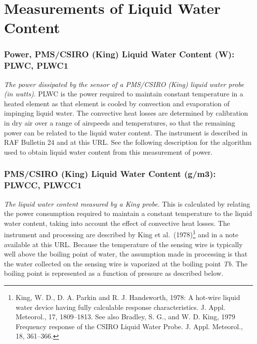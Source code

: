 \documentclass[
]{book}
\begin{document}
\hypertarget{LWC}{%
\section{Measurements of Liquid Water Content}\label{LWC}}

\hypertarget{plwc}{%
\subsubsection*{Power, PMS/CSIRO (King) Liquid Water Content (W): PLWC, PLWC1}\label{plwc}}

\emph{The power dissipated by the sensor of a PMS/CSIRO (King) liquid water probe (in watts).} PLWC is the power required to maintain constant temperature in a heated element as that element is cooled by convection and evaporation of impinging liquid water. The convective heat losses are determined by calibration in dry air over a range of airspeeds and temperatures, so that the remaining power can be related to the liquid water content. The instrument is described in RAF Bulletin 24 and at this URL. See the following
description for the algorithm used to obtain liquid water content from this measurement of power.

\hypertarget{plwcc}{%
\subsubsection*{\texorpdfstring{PMS/CSIRO (King) Liquid Water Content (g/m{3}): PLWCC, PLWCC1}{PMS/CSIRO (King) Liquid Water Content (g/m3): PLWCC, PLWCC1}}\label{plwcc}}

\emph{The liquid water content} \emph{measured by a King probe.} This is calculated by relating the power consumption required to maintain a constant temperature to the liquid water content, taking into account the effect of convective heat losses. The instrument and processing are described by King et al.~(1978)\footnote{King, W. D., D. A. Parkin and R. J. Handsworth, 1978: A hot-wire liquid water device having fully calculable response characteristics. J. Appl. Meteorol., 17, 1809--1813. See also Bradley, S. G., and W. D. King, 1979 Frequency response of the CSIRO Liquid Water Probe. J. Appl. Meteorol., 18, 361--366.}
and in a note available at this URL. Because the temperature of the sensing wire is typically well above the boiling point of water, the assumption made in processing is that the water collected on the sensing wire is vaporized at the boiling point {\emph{T}\emph{b}}. The boiling point is represented as a function of pressure as described below.
\end{document}
